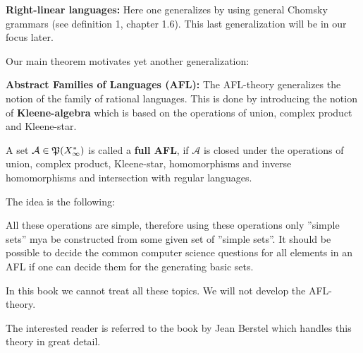 {\bf Right-linear languages:} Here one generalizes by using general Chomsky
grammars (see definition 1, chapter 1.6). This last generalization will be in
our focus later.

Our main theorem motivates yet another generalization:

{\bf Abstract Families of Languages (AFL):} The AFL-theory generalizes the
notion of the family of rational languages. This is done by introducing the
notion of {\bf Kleene-algebra} which is based on the operations of union,
complex product and Kleene-star.

A set $\mathcal{A} \in \mathfrak{P}(X_\infty^*)$ is called a {\bf full AFL}, if
$\mathcal{A}$ is closed under the operations of union, complex product,
Kleene-star, homomorphisms and inverse homomorphisms and intersection with
regular languages.

The idea is the following:

All these operations are simple, therefore using these operations only ''simple
sets'' mya be constructed from some given set of ''simple sets''. It should be
possible to decide the common computer science questions for all elements in an
AFL if one can decide them for the generating basic sets.

In this book we cannot treat all these topics. We will not develop the
AFL-theory.

The interested reader is referred to the book by Jean Berstel \cite{Berstel79}
which handles this theory in great detail.

